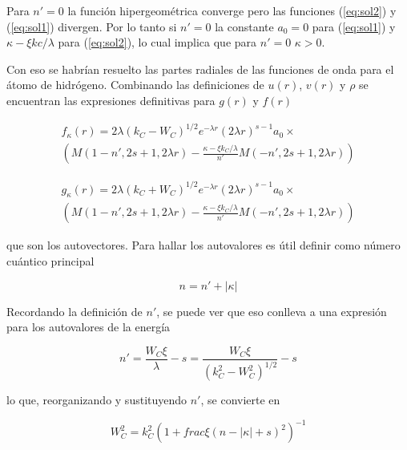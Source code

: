 \documentclass[a4paper, 12pt]{article} %
\begin{document}
Para $n' = 0$ la funci\'on hipergeom\'etrica converge pero las funciones (\ref{eq:sol2}) y (\ref{eq:sol1})
divergen. Por lo tanto si $n'=0$ la constante $a_0 = 0$ para (\ref{eq:sol1}) y $\kappa - \xi kc / \lambda$
para (\ref{eq:sol2}), lo cual implica que para $n'=0$ $\kappa > 0$. 





Con eso se habr\'ian resuelto las partes radiales de las funciones de onda para el \'atomo de hidr\'ogeno. Combinando las definiciones de $u(r)$, $v(r)$ y $\rho$ se encuentran las expresiones definitivas para $g(r)$ y $f(r)$

\begin{equation}
\begin{split}
f_{\kappa}(r)=2\lambda (k_C -W_C)^{1/2}e^{-\lambda r}(2\lambda r)^{s-1}a_0 \times \\
\left( M(1-n',2s+1,2\lambda r) - \frac{\kappa-\xi k_C /\lambda}{n'} M(-n',2s+1,2\lambda r) \right)
\end{split}
\end{equation}

\begin{equation}
\begin{split}
g_{\kappa}(r)=2\lambda (k_C +W_C)^{1/2}e^{-\lambda r}(2\lambda r)^{s-1}a_0 \times \\
\left( M(1-n',2s+1,2\lambda r) - \frac{\kappa-\xi k_C /\lambda}{n'} M(-n',2s+1,2\lambda r) \right)
\end{split}
\end{equation}

que son los autovectores. Para hallar los autovalores es \'util definir como n\'umero cu\'antico principal 

\begin{equation}
n=n'+|\kappa|
\end{equation}

Recordando la definici\'on de $n'$, se puede ver que eso conlleva a una expresi\'on para los autovalores de la energ\'ia

\begin{equation}
n'= \frac{W_C \xi}{\lambda}-s=\frac{W_C \xi}{(k^2_{C}-W^2_{C})^{1/2}}-s
\end{equation}

lo que, reorganizando y sustituyendo $n'$, se convierte en

\begin{equation}
W^2_C = k^2_C \left(1+frac{\xi}{(n-|\kappa|+s)^2} \right)^{-1}
\end{equation}
\end{document}
